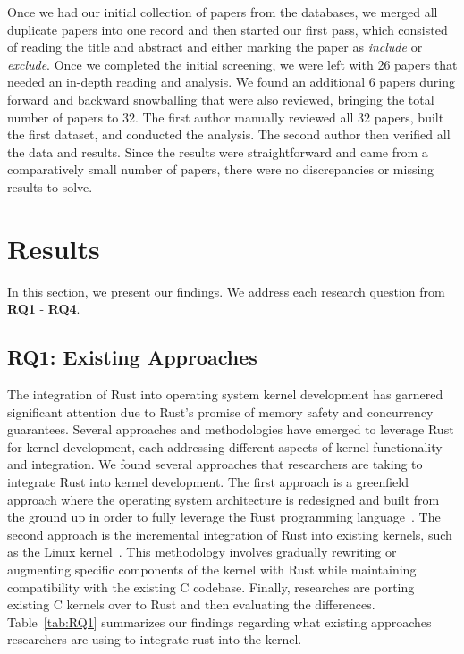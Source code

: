 \documentclass[sigconf]{acmart}
\begin{document}
Once we had our initial collection of papers from the databases, we merged all duplicate papers into
one record and then started our first pass, which consisted of reading the title and abstract and
either marking the paper as \textit{include} or \textit{exclude}. Once we completed the initial screening, we were left with 26 papers that needed an in-depth reading and analysis. We found an additional 6 papers during forward and backward snowballing that were also reviewed, bringing the total number of papers to 32. The first author manually reviewed all 32 papers, built the first dataset, and conducted the analysis. The second author then verified all the data and results. Since the results were straightforward and came from a comparatively small number of papers, there were no discrepancies or missing results to solve. 

\section{Results}

In this section, we present our findings. We address each research question from \textbf{RQ1} - \textbf{RQ4}.

\subsection{RQ1: Existing Approaches}



The integration of Rust into operating system kernel development has garnered significant attention
due to Rust's promise of memory safety and concurrency guarantees. Several approaches and
methodologies have emerged to leverage Rust for kernel development, each addressing different
aspects of kernel functionality and integration.  We found several approaches that researchers are
taking to integrate Rust into kernel development. The first approach is a greenfield approach
where the operating system architecture is redesigned and built from the ground up in order to fully
leverage the Rust programming language~\cite{Culic2022-bk, Boos2020-zh}. The second approach is the incremental integration of Rust
into existing kernels, such as the Linux
kernel~\cite{The_kernel_development_community_undated-iw, Miller2021-pg, Oikawa2023-ms}. This methodology involves gradually
rewriting or augmenting specific components of the kernel with Rust while maintaining compatibility
with the existing C codebase. Finally, researches are porting existing C kernels over to Rust and then evaluating the differences. Table~\ref{tab:RQ1} summarizes our findings regarding what existing
approaches researchers are using to integrate rust into the kernel.
\end{document}
